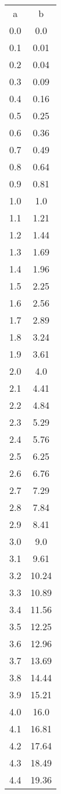 \begin{table}
\begin{tabular}{cc}
a & b \\
0.0 & 0.0 \\
0.1 & 0.01 \\
0.2 & 0.04 \\
0.3 & 0.09 \\
0.4 & 0.16 \\
0.5 & 0.25 \\
0.6 & 0.36 \\
0.7 & 0.49 \\
0.8 & 0.64 \\
0.9 & 0.81 \\
1.0 & 1.0 \\
1.1 & 1.21 \\
1.2 & 1.44 \\
1.3 & 1.69 \\
1.4 & 1.96 \\
1.5 & 2.25 \\
1.6 & 2.56 \\
1.7 & 2.89 \\
1.8 & 3.24 \\
1.9 & 3.61 \\
2.0 & 4.0 \\
2.1 & 4.41 \\
2.2 & 4.84 \\
2.3 & 5.29 \\
2.4 & 5.76 \\
2.5 & 6.25 \\
2.6 & 6.76 \\
2.7 & 7.29 \\
2.8 & 7.84 \\
2.9 & 8.41 \\
3.0 & 9.0 \\
3.1 & 9.61 \\
3.2 & 10.24 \\
3.3 & 10.89 \\
3.4 & 11.56 \\
3.5 & 12.25 \\
3.6 & 12.96 \\
3.7 & 13.69 \\
3.8 & 14.44 \\
3.9 & 15.21 \\
4.0 & 16.0 \\
4.1 & 16.81 \\
4.2 & 17.64 \\
4.3 & 18.49 \\
4.4 & 19.36 \\

\end{tabular}
\end{table}
